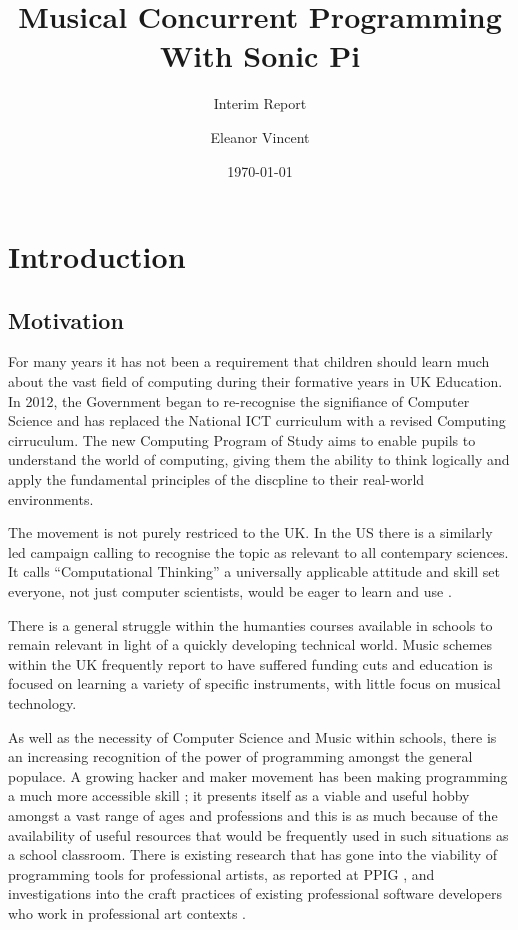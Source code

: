 \documentclass[11pt]{scrartcl}
\begin{document}
\title{Musical Concurrent Programming \\ With Sonic Pi}
\subtitle{Interim Report}
\author{Eleanor Vincent}
\date{\today}
\maketitle

\section{Introduction}

\subsection{Motivation}
For many years it has not been a requirement that children should learn much
about the vast field of computing during their formative years in UK 
Education. In 2012, the Government began to re-recognise the signifiance of 
Computer Science and has replaced the National ICT curriculum with a revised 
Computing cirruculum. The new Computing Program of Study \cite{DfE13} aims to 
enable pupils to understand the world of computing, giving them the ability to 
think logically and apply the fundamental principles of the discpline to their 
real-world environments.

The movement is not purely restriced to the UK. In the US there is a similarly 
led campaign calling to recognise the topic as relevant to all contempary 
sciences. It calls ``Computational Thinking'' a universally applicable 
attitude and skill set everyone, not just computer scientists, would be eager 
to learn and use \cite{Wing06}.

There is a general struggle within the humanties courses available in schools to 
remain relevant in light of a quickly developing technical world. Music schemes 
within the UK frequently report to have suffered funding cuts and education is 
focused on learning a variety of specific instruments, with little focus on 
musical technology.

As well as the necessity of Computer Science and Music within schools, there 
is an increasing recognition of the power of programming amongst the general 
populace. A growing hacker and maker movement has been making programming a 
much more accessible skill \cite{BAD14}; it presents itself as a viable and 
useful hobby amongst a vast range of ages and professions and this is as much 
because of the availability of useful resources that would be frequently used 
in such situations as a school classroom. There is existing research that has 
gone into the viability of programming tools for professional artists, as 
reported at PPIG \cite{Ch12,BC05}, and investigations into the craft practices 
of existing professional software developers who work in professional art 
contexts \cite{W10}.
\end{document}
